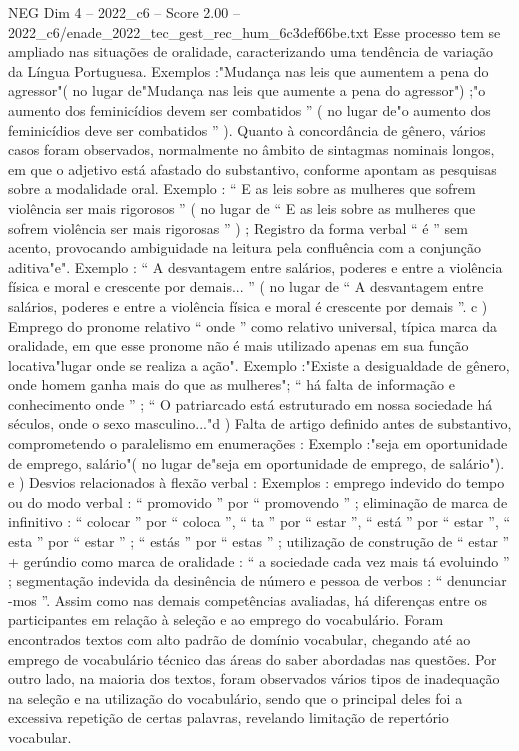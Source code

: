 \begin{textsample}{NEG Dim 4 – 2022\_c6 – Score 2.00 – 2022\_c6/enade\_2022\_tec\_gest\_rec\_hum\_6c3def66be.txt}
Esse processo tem se ampliado nas situações de oralidade, caracterizando uma tendência de variação da Língua Portuguesa.
Exemplos :"Mudança nas leis que aumentem a pena do agressor"( no lugar de"Mudança nas leis que aumente a pena do agressor") ;"o aumento dos feminicídios devem ser combatidos ” ( no lugar de"o aumento dos feminicídios deve ser combatidos ” ).
Quanto à concordância de gênero, vários casos foram observados, normalmente no âmbito de sintagmas nominais longos, em que o adjetivo está afastado do substantivo, conforme apontam as pesquisas sobre a modalidade oral.
Exemplo : “ E as leis sobre as mulheres que sofrem violência ser mais rigorosos ” ( no lugar de “ E as leis sobre as mulheres que sofrem violência ser mais rigorosas ” ) ; Registro da forma verbal “ é ” sem acento, provocando ambiguidade na leitura pela confluência com a conjunção aditiva"e".
Exemplo : “ A desvantagem entre salários, poderes e entre a violência física e moral e crescente por demais... ” ( no lugar de “ A desvantagem entre salários, poderes e entre a violência física e moral é crescente por demais ”. c ) Emprego do pronome relativo “ onde ” como relativo universal, típica marca da oralidade, em que esse pronome não é mais utilizado apenas em sua função locativa"lugar onde se realiza a ação".
Exemplo :"Existe a desigualdade de gênero, onde homem ganha mais do que as mulheres"; “ há falta de informação e conhecimento onde ” ; “ O patriarcado está estruturado em nossa sociedade há séculos, onde o sexo masculino..."d ) Falta de artigo definido antes de substantivo, comprometendo o paralelismo em enumerações : Exemplo :"seja em oportunidade de emprego, salário"( no lugar de"seja em oportunidade de emprego, de salário"). e ) Desvios relacionados à flexão verbal : Exemplos : emprego indevido do tempo ou do modo verbal : “ promovido ” por “ promovendo ” ; eliminação de marca de infinitivo : “ colocar ” por “ coloca ”, “ ta ” por “ estar ”, “ está ” por “ estar ”, “ esta ” por “ estar ” ; “ estás ” por “ estas ” ; utilização de construção de “ estar ” + gerúndio como marca de oralidade : “ a sociedade cada vez mais tá evoluindo ” ; segmentação indevida da desinência de número e pessoa de verbos : “ denunciar -mos ”.
Assim como nas demais competências avaliadas, há diferenças entre os participantes em relação à seleção e ao emprego do vocabulário.
Foram encontrados textos com alto padrão de domínio vocabular, chegando até ao emprego de vocabulário técnico das áreas do saber abordadas nas questões.
Por outro lado, na maioria dos textos, foram observados vários tipos de inadequação na seleção e na utilização do vocabulário, sendo que o principal deles foi a excessiva repetição de certas palavras, revelando limitação de repertório vocabular.

\end{textsample}

